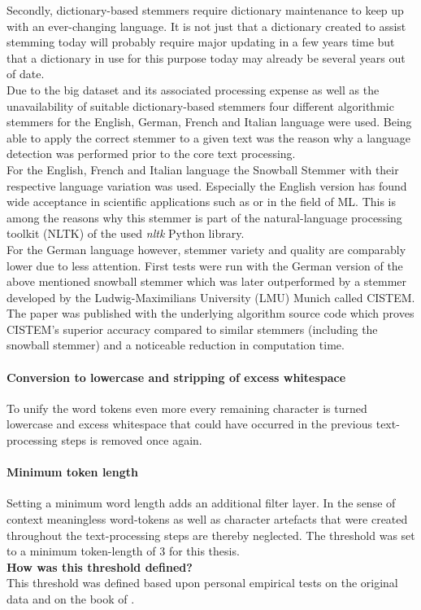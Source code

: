 Secondly, dictionary-based stemmers require dictionary maintenance to keep up with an ever-changing language. It is not just that a dictionary created to assist stemming today will probably require major updating in a few years time but that a dictionary in use for this purpose today may already be several years out of date.\\
Due to the big dataset and its associated processing expense as well as the unavailability of suitable dictionary-based stemmers four different algorithmic stemmers for the English, German, French and Italian language were used. Being able to apply the correct stemmer to a given text was the reason why a language detection was performed prior to the core text processing.\\
For the English, French and Italian language the Snowball Stemmer \parencite{Porter2001} with their respective language variation was used. Especially the English version has found wide acceptance in scientific applications such as \textcite{Krauthammer2011} or \textcite{Joulin2016} in the field of ML. This is among the reasons why this stemmer is part of the natural-language processing toolkit (NLTK) \parencite{Manning2014} of the used \textit{nltk} Python library.\\
For the German language however, stemmer variety and quality are comparably lower due to less attention. First tests were run with the German version of the above mentioned snowball stemmer which was later outperformed by a stemmer developed by the Ludwig-Maximilians University (LMU) Munich called CISTEM. The paper \textcite{Weissweiler2018} was published with the underlying algorithm source code which proves CISTEM's superior accuracy compared to similar stemmers (including the snowball stemmer) and a noticeable reduction in computation time.

\paragraph*{Conversion to lowercase and stripping of excess whitespace}
To unify the word tokens even more every remaining character is turned lowercase and excess whitespace that could have occurred in the previous text-processing steps is removed once again.

\paragraph*{Minimum token length}
Setting a minimum word length adds an additional filter layer. In the sense of context meaningless word-tokens as well as character artefacts that were created throughout the text-processing steps are thereby neglected. The threshold was set to a minimum token-length of 3 for this thesis.\\
\newline
\textbf{How was this threshold defined?}\\
\newline
This threshold was defined based upon personal empirical tests on the original data and on the book of \textcite{Guido2016}.

